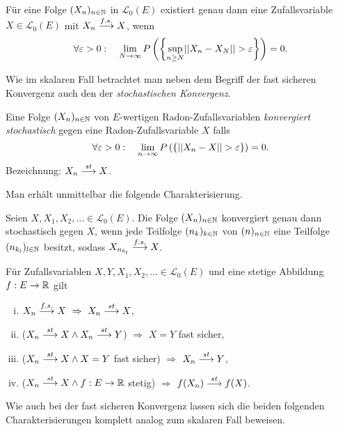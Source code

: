 \begin{theorem}
    Für eine Folge $(X_n)_{n \in \mathbb{N}}$ in $\mathcal{L}_0(E)$ existiert genau dann eine Zufallsvariable $X \in \mathcal{L}_0(E)$ mit \mbox{$X_n \overset{f.s.}{\longrightarrow} X$}, wenn
    $$
        \forall \varepsilon > 0 : \quad \lim_{N \to \infty}P\left(\left\{ \sup_{n\geq N}\lvert\lvert X_n - X_N \rvert\rvert > \varepsilon \right\}\right) = 0. 
    $$
\end{theorem}

Wie im skalaren Fall betrachtet man neben dem Begriff der fast sicheren Konvergenz auch den der \textit{stochastischen Konvergenz}.

\begin{mydef}
    Eine Folge $(X_n)_{n \in \mathbb{N}}$ von $E$-wertigen Radon-Zufallsvariablen \textit{konvergiert stochastisch} gegen eine Radon-Zufallsvariable $X$ falls
    $$
        \forall \varepsilon > 0: \quad \lim_{n \to \infty}P\left(\left\{ \lvert\lvert X_n - X  \rvert\rvert > \varepsilon \right\}\right) = 0. 
    $$      
    Bezeichnung: $X_n \overset{st}{\longrightarrow} X$. 
\end{mydef}

Man erhält unmittelbar die folgende Charakterisierung. 

\begin{theorem}[Teilfolgenkriterium]
    Seien $X,X_1,X_2,... \in \mathcal{L}_0(E)$. Die Folge $(X_n)_{n \in \mathbb{N}}$ konvergiert genau dann stochastisch gegen $X$, 
    wenn jede Teilfolge $(n_k)_{k \in \mathbb{N}}$ von $(n)_{n \in \mathbb{N}}$ eine Teilfolge $(n_{k_l})_{l \in \mathbb{N}}$ besitzt, sodass $X_{n_{k_l}} \overset{f.s.}{\longrightarrow} X$.  
\end{theorem}

\begin{corollary}
    Für Zufallsvariablen $X,Y, X_1, X_2,... \in \mathcal{L}_0(E)$ und eine stetige Abbildung $f:E \to \mathbb{R}$ gilt
    \begin{enumerate}[(i)]
        \item $X_n \overset{f.s.}{\longrightarrow} X \ \Rightarrow \ X_n \overset{st}{\longrightarrow} X$,
        \item ($X_n \overset{st}{\longrightarrow} X \land X_n \overset{st}{\longrightarrow} Y$) $\Rightarrow$ $ X = Y$ fast sicher,
        \item ($X_n \overset{st}{\longrightarrow} X \land X = Y$ fast sicher) $\Rightarrow$ $X_n \overset{st}{\longrightarrow} Y$,
        \item ($X_n \overset{st}{\longrightarrow} X \land f:E \to \mathbb{R}$ stetig) $\Rightarrow$ $f(X_n) \overset{st}{\longrightarrow} f(X)$. 
    \end{enumerate}
\end{corollary}

Wie auch bei der fast sicheren Konvergenz lassen sich die beiden folgenden Charakterisierungen komplett analog zum skalaren Fall beweisen. 

